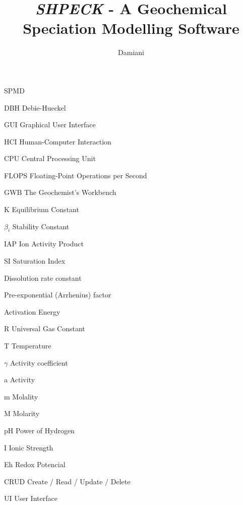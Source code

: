 \documentclass[ppgc,mestrado,english]{iiufrgs}
\title{\emph{SHPECK} - A Geochemical Speciation Modelling Software}
\author{Damiani}{Leonardo Hax}
\begin{document}
	
\renewcommand{\lstlistingname}{Code}

\maketitle

\clearpage
\begin{flushright}
\mbox{}\vfill
\end{flushright}

\renewcommand*\contentsname{Summary}
\tableofcontents



\begin{listofabbrv}{SPMD}
        \item[DBH] Debie-Hueckel 
        \item[GUI] Graphical User Interface
        \item[HCI] Human-Computer Interaction
        \item[CPU] Central Processing Unit
        \item[FLOPS] Floating-Point Operations per Second
        \item[GWB] The Geochemist's Workbench
        \item[K] Equilibrium Constant
        \item[$\beta_i$] Stability Constant 
        \item[IAP] Ion Activity Product 
        \item[SI] Saturation Index 
        \item[\ce{k_{diss}}] Dissolution rate constant
        \item[\ce{k_0}] Pre-exponential (Arrhenius) factor
        \item[\ce{E_a}] Activation Energy
        \item[R] Universal Gas Constant
        \item[T] Temperature
        \item[$\gamma$] Activity coefficient
        \item[a] Activity
        \item[m] Molality
        \item[M] Molarity
        \item[pH] Power of Hydrogen
        \item[I] Ionic Strength
        \item[Eh] Redox Potencial
        \item[CRUD] Create / Read / Update / Delete
        \item[UI] User Interface
\end{listofabbrv}
\end{document}
